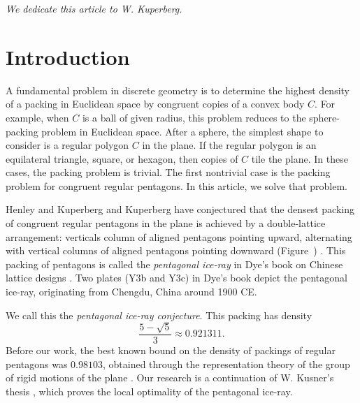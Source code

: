 \def\threepentnoD#1#2#3#4#5#6#7#8#9{%
\pen{#1}{#2}{#3};
\pen{#4}{#5}{#6};
\pen{#7}{#8}{#9}
}

\def\blankfig#1{\tikzfig{#1}{Insert graphic}
{
[scale=1]
\draw(0,) circle(1cm);
}}



\centerline{\it We dedicate this article to W. Kuperberg.}

\section{Introduction}\label{XX} %

A fundamental problem in discrete geometry is to determine the highest
density of a packing in Euclidean space by congruent copies of a
convex body $C$.  For example, when $C$ is a ball of given radius,
this problem reduces to the sphere-packing problem in Euclidean space.
After a sphere, the simplest shape to consider is a regular polygon
$C$ in the plane.  If the regular polygon is an equilateral
triangle, square, or hexagon, then copies of $C$ tile the plane.  In
these cases, the packing problem is trivial.  The first nontrivial
case is the packing problem for congruent regular pentagons.  In this
article, we solve that problem.

Henley and Kuperberg and Kuperberg have conjectured that the densest
packing of congruent regular pentagons in the plane is achieved by a
double-lattice arrangement: verticals column of aligned pentagons
pointing upward, alternating with vertical columns of aligned
pentagons pointing downward (Figure~)
\cite{Kup} \cite[p.801]{henley}.  This packing of pentagons is called
the {\it pentagonal ice-ray} in Dye's book on Chinese lattice designs
\cite{dye}.  Two plates (Y3b and Y3c) in Dye's book depict the
pentagonal ice-ray, originating from Chengdu, China around 1900 CE.

 We call this the {\it pentagonal ice-ray  conjecture}.
This packing has density
\[
\frac{5 - \sqrt{5}}3 \approx 0.921311.
\] %
Before our work, the best known bound on the density of packings of
regular pentagons was $0.98103$, obtained through the representation
theory of the group of rigid motions of the plane \cite{Val}.  Our
research is a continuation of W. Kusner's thesis \cite{Kus}, which
proves the local optimality of the pentagonal ice-ray.


